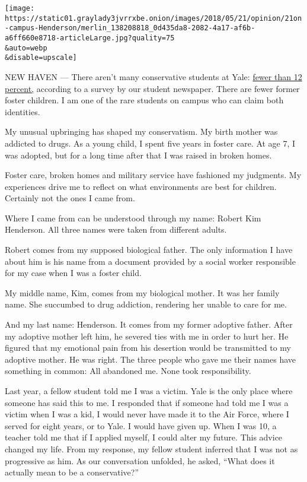 \texttt{[image: https://static01.graylady3jvrrxbe.onion/images/2018/05/21/opinion/21on-campus-Henderson/merlin\_138208818\_0d435da8-2082-4a17-af6b-a6ff660e8718-articleLarge.jpg?quality=75\\\&auto=webp\\\&disable=upscale]}

NEW HAVEN --- There aren't many conservative students at Yale:
\href{http://features.yaledailynews.com/blog/2016/10/27/election-2016-conservative-views-considered-unwelcome-at-yale/}{fewer
than 12 percent,} according to a survey by our student newspaper. There
are fewer former foster children. I am one of the rare students on
campus who can claim both identities.

My unusual upbringing has shaped my conservatism. My birth mother was
addicted to drugs. As a young child, I spent five years in foster care.
At age 7, I was adopted, but for a long time after that I was raised in
broken homes.

Foster care, broken homes and military service have fashioned my
judgments. My experiences drive me to reflect on what environments are
best for children. Certainly not the ones I came from.

Where I came from can be understood through my name: Robert Kim
Henderson. All three names were taken from different adults.

Robert comes from my supposed biological father. The only information I
have about him is his name from a document provided by a social worker
responsible for my case when I was a foster child.

My middle name, Kim, comes from my biological mother. It was her family
name. She succumbed to drug addiction, rendering her unable to care for
me.

And my last name: Henderson. It comes from my former adoptive father.
After my adoptive mother left him, he severed ties with me in order to
hurt her. He figured that my emotional pain from his desertion would be
transmitted to my adoptive mother. He was right. The three people who
gave me their names have something in common: All abandoned me. None
took responsibility.

Last year, a fellow student told me I was a victim. Yale is the only
place where someone has said this to me. I responded that if someone had
told me I was a victim when I was a kid, I would never have made it to
the Air Force, where I served for eight years, or to Yale. I would have
given up. When I was 10, a teacher told me that if I applied myself, I
could alter my future. This advice changed my life. From my response, my
fellow student inferred that I was not as progressive as him. As our
conversation unfolded, he asked, ``What does it actually mean to be a
conservative?''

